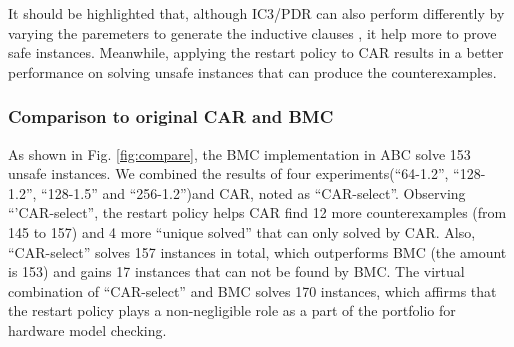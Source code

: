 It should be highlighted that, although IC3/PDR can also perform differently by varying the paremeters to generate the inductive clauses \cite{GR16}, it help more to prove safe instances. Meanwhile, applying the restart policy to CAR results in a better performance on solving unsafe instances that can produce the counterexamples. 

\subsubsection{Comparison to original CAR and BMC }
As shown in Fig. \ref{fig:compare}, the BMC implementation in ABC solve 153 unsafe instances. We combined the results of four experiments(``64-1.2'', ``128-1.2'', ``128-1.5'' and ``256-1.2'')and CAR, noted as ``CAR-select''. Observing ``'CAR-select'', the restart policy helps CAR find 12 more counterexamples (from 145 to 157) and 4 more ``unique solved'' that can only solved by CAR. Also, ``CAR-select'' solves 157 instances in total, which outperforms BMC (the amount is 153) and gains 17 instances that can not be found by BMC. The virtual combination of ``CAR-select'' and BMC solves 170 instances, which affirms that the restart policy plays a non-negligible role as a part of the portfolio for hardware model checking.
